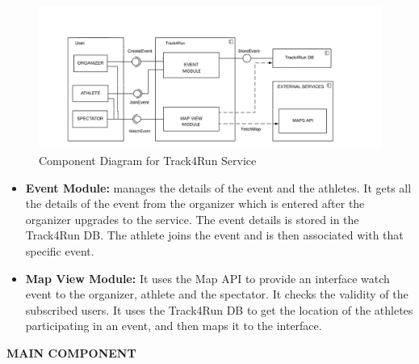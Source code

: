 \begin{figure}[H]
	\begin{center}
		\includegraphics[width=\textwidth]{./DD_Diagrams/ComponentTrack4Run.jpg}
      	\caption{Component Diagram for Track4Run Service}
        \label{TrackMe_c3}
	\end{center}
\end{figure}

\begin{itemize}
\item\textbf{Event Module:} manages the details of the event and the athletes. It gets all the details of the event from the organizer which is entered after the organizer upgrades to the service. The event details is stored in the Track4Run DB. The athlete joins the event and is then associated with that specific event. 
\item\textbf{Map View Module:} It uses the Map API to provide an interface watch event to the organizer, athlete and the spectator. It checks the validity of the subscribed users. It uses the Track4Run DB to get the location of the athletes participating in an event, and then maps it to the interface.
\newline\newline\newline\newline\newline
\end{itemize}
\textbf{MAIN COMPONENT}

